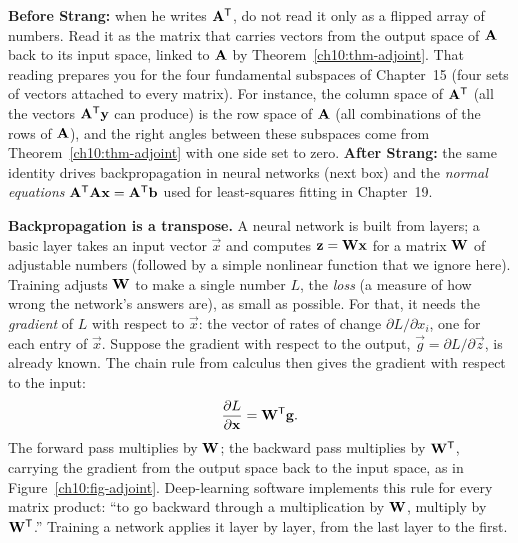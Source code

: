 \begin{strangbox}
\textbf{Before Strang:} when he writes $\mathbf{A}^{\mathsf{T}}$, do not read it only as a flipped array of
numbers. Read it as the matrix that carries vectors from the output space of $\mathbf{A}$ back to its
input space, linked to $\mathbf{A}$ by Theorem~\ref{ch10:thm-adjoint}. That reading prepares you for
the four fundamental subspaces of Chapter~15 (four sets of vectors attached to every matrix). For
instance, the column space of $\mathbf{A}^{\mathsf{T}}$ (all the vectors $\mathbf{A}^{\mathsf{T}}\mathbf{y}$ can produce) is the
row space of $\mathbf{A}$ (all combinations of the rows of $\mathbf{A}$), and the right angles between
these subspaces come from Theorem~\ref{ch10:thm-adjoint} with one side set to zero.
\textbf{After Strang:} the same identity drives backpropagation in neural networks (next box) and
the \emph{normal equations} $\mathbf{A}^{\mathsf{T}}\mathbf{A}\mathbf{x}=\mathbf{A}^{\mathsf{T}}\mathbf{b}$ used for least-squares
fitting in Chapter~19.
\end{strangbox}

\begin{applicationbox}
\textbf{Backpropagation is a transpose.} A neural network is built from layers; a basic layer takes
an input vector $\vec{x}$ and computes $\mathbf{z}=\mathbf{W}\mathbf{x}$ for a matrix $\mathbf{W}$ of adjustable
numbers (followed by a simple nonlinear function that we ignore here). Training adjusts $\mathbf{W}$ to
make a single number $L$, the \emph{loss} (a measure of how wrong the network's answers are), as
small as possible. For that, it needs the \emph{gradient} of $L$ with respect to $\vec{x}$: the
vector of rates of change $\partial L/\partial x_i$, one for each entry of $\vec{x}$. Suppose the
gradient with respect to the output, $\vec{g}=\partial L/\partial \vec{z}$, is already known. The
chain rule from calculus then gives the gradient with respect to the input:
\[
  \frac{\partial L}{\partial \mathbf{x}} = \mathbf{W}^{\mathsf{T}} \mathbf{g}.
\]
The forward pass multiplies by $\mathbf{W}$; the backward pass multiplies by $\mathbf{W}^{\mathsf{T}}$, carrying
the gradient from the output space back to the input space, as in Figure~\ref{ch10:fig-adjoint}.
Deep-learning software implements this rule for every matrix product: ``to go backward through a
multiplication by $\mathbf{W}$, multiply by $\mathbf{W}^{\mathsf{T}}$.'' Training a network applies it layer by
layer, from the last layer to the first.
\end{applicationbox}

